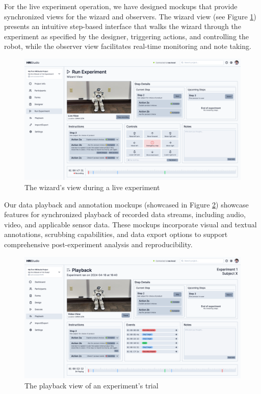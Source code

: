 \documentclass[letterpaper, 10 pt, conference]{ieeeconf}
\begin{document}
For the live experiment operation, we have designed mockups that provide synchronized views for the wizard and observers. The wizard view (see Figure \ref{wizardview}) presents an intuitive step-based interface that walks the wizard through the experiment as specified by the designer, triggering actions, and controlling the robot, while the observer view facilitates real-time monitoring and note taking.

\begin{figure}[h]
    \begin{center}
        \includegraphics[width=0.4\paperwidth]{assets/mockups/wizardview}
         \vskip -0.3cm
        \caption{The wizard's view during a live experiment}
        \label{wizardview}
    \end{center}
    \vskip -0.5cm
\end{figure}

Our data playback and annotation mockups (showcased in Figure \ref{playback}) showcase features for synchronized playback of recorded data streams, including audio, video, and applicable sensor data. These mockups incorporate visual and textual annotations, scrubbing capabilities, and data export options to support comprehensive post-experiment analysis and reproducibility.

\begin{figure}[h]
    \begin{center}
        \includegraphics[width=0.4\paperwidth]{assets/mockups/playback}
         \vskip -0.3cm
        \caption{The playback view of an experiment's trial}
        \label{playback}
    \end{center}
    \vskip -0.7cm
\end{figure}
\end{document}
